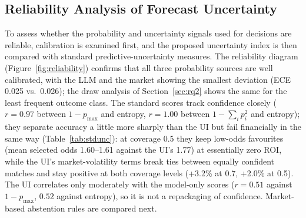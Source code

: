 \documentclass[10pt]{article}
\begin{document}
\subsection{Reliability Analysis of Forecast Uncertainty}
\label{sec:reliab}
To assess whether the probability and uncertainty signals used for decisions
are reliable, calibration is examined first, and the proposed uncertainty
index is then compared with standard predictive-uncertainty measures. The
reliability diagram (Figure~\ref{fig:reliability}) confirms that all three
probability sources are well calibrated, with the LLM and the market showing
the smallest deviation (ECE 0.025 vs.\ 0.026); the draw analysis of
Section~\ref{sec:rq2} shows the same for the least frequent outcome class.
The standard scores track confidence closely ($r = 0.97$ between $1-p_{\max}$ and
entropy, $r = 1.00$ between $1-\sum_i p_i^2$ and entropy); they separate accuracy
a little more sharply than the UI but fail financially in the same way
(Table~\ref{tab:stdunc}): at coverage 0.5 they keep low-odds favourites (mean
selected odds 1.60--1.61 against the UI's 1.77) at essentially zero ROI, while
the UI's market-volatility terms break ties between equally confident matches and
stay positive at both coverage levels (+3.2\% at 0.7, +2.0\% at 0.5).
The UI correlates only moderately with the model-only scores ($r = 0.51$
against $1-p_{\max}$, $0.52$ against entropy), so it is not a repackaging of
confidence. Market-based abstention rules are compared next.
\end{document}
